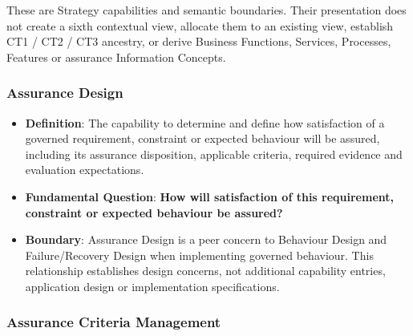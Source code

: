 \label{rad:enabling:678}

These are Strategy capabilities and semantic boundaries. Their presentation does not create a sixth contextual view, allocate them to an existing view, establish CT1 /\allowbreak{} CT2 /\allowbreak{} CT3 ancestry, or derive Business Functions, Services, Processes, Features or assurance Information Concepts.

\label{rad:enabling:680}
\subsubsection*{Assurance Design}
\label{rad:enabling:682}

\begin{itemize}

\item
\textbf{Definition}: The capability to determine and define how satisfaction of a governed requirement, constraint or expected behaviour will be assured, including its assurance disposition, applicable criteria, required evidence and evaluation expectations.



\item
\textbf{Fundamental Question}: \textbf{How will satisfaction of this requirement, constraint or expected behaviour be assured?}



\item
\textbf{Boundary}: Assurance Design is a peer concern to Behaviour Design and Failure/\allowbreak{}Recovery Design when implementing governed behaviour. This relationship establishes design concerns, not additional capability entries, application design or implementation specifications.



\end{itemize}
\label{rad:enabling:686}
\subsubsection*{Assurance Criteria Management}
\label{rad:enabling:688}

